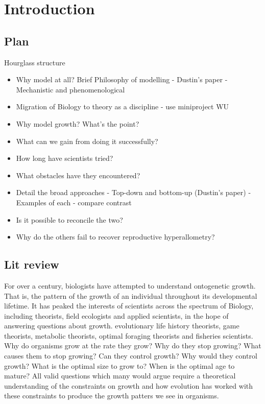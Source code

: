 \documentclass[a4paper]{article} %
\begin{document}
\vspace*{250px}
\section{Introduction}\thispagestyle{empty}
    \subsection{Plan}
        Hourglass structure
        \begin{itemize}
            \item Why model at all? Brief Philosophy of modelling - Dustin's paper - Mechanistic and phenomenological
            \item Migration of Biology to theory as a discipline - use miniproject WU
            \item Why model growth? What's the point? 
            \item What can we gain from doing it successfully? 
            \item How long have scientists tried?
            \item What obstacles have they encountered?
            \item Detail the broad approaches - Top-down and bottom-up (Dustin's paper) - Examples of each - compare contrast
            \item Is it possible to reconcile the two?
            \item Why do the others fail to recover reproductive hyperallometry?
        \end{itemize}
    
    \subsection{Lit review}
        For over a century, biologists have attempted to understand ontogenetic growth. That is, the pattern of the growth of an individual throughout its developmental lifetime. It has peaked the interests of scientists across the spectrum of Biology, including theorists, field ecologists and applied scientists, in the hope of answering questions about growth. evolutionary life history theorists, game theorists, metabolic theorists, optimal foraging theorists and fisheries scientists. Why do organisms grow at the rate they grow? Why do they stop growing? What causes them to stop growing? Can they control growth? Why would they control growth? What is the optimal size to grow to? When is the optimal age to mature? All valid questions which many would argue require a theoretical understanding of the constraints on growth and how evolution has worked with these constraints to produce the growth patters we see in organisms.
\end{document}
